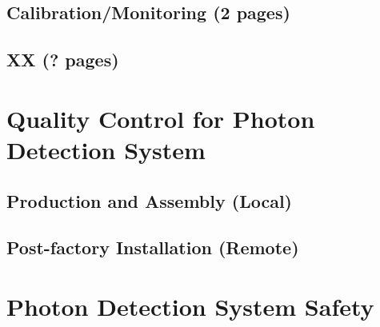 \subsection{Calibration/Monitoring  (2 pages)}
\label{sec:fdsp-pd-install-calib}

\subsection{XX  (? pages)}
\label{sec:fdsp-pd-install-xxx}



\section{Quality Control for Photon Detection System}
\label{sec:fdsp-pd-qc}


\subsection{Production and Assembly (Local)}
\label{sec:fdsp-pd-qc-local}


\subsection{Post-factory Installation (Remote)}
\label{sec:fdsp-pd-qc-remote}



\section{Photon Detection System Safety}
\label{sec:fdsp-pd-safety}




